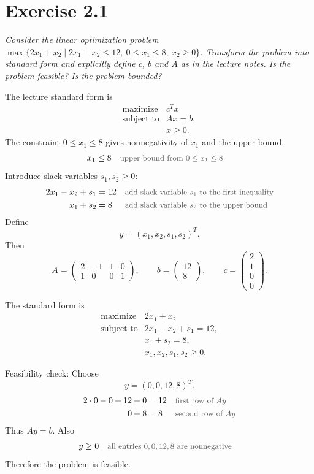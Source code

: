 \documentclass[a4paper,11pt]{article}
\newif\ifexplain
\newcommand{\aufgabe}[1]{\section*{#1}}
\newcommand{\angabe}[1]{\textit{#1}\par\smallskip}
\newcommand{\why}[1]{\text{\small\color{black!65}#1}}
\newcommand{\explain}[1]{\ifexplain\begin{erklbox}#1\end{erklbox}\fi}
\begin{document}
\aufgabe{Exercise 2.1}
\angabe{Consider the linear optimization problem $\max\{2x_1+x_2\mid 2x_1-x_2\le 12,\ 0\le x_1\le 8,\ x_2\ge0\}$. Transform the problem into standard form and explicitly define $c$, $b$ and $A$ as in the lecture notes. Is the problem feasible? Is the problem bounded?}
\explain{Die Vorlesungs-Standardform lautet: maximize $c^Tx$ subject to $Ax=b$ and $x\ge0$. Deshalb werden die Ungleichungen mit Schlupfvariablen in Gleichungen umgeschrieben.}

The lecture standard form is
\[
\begin{array}{ll}
\text{maximize} & c^Tx\\
\text{subject to} & Ax=b,\\
& x\ge0.
\end{array}
\]
The constraint $0\le x_1\le8$ gives nonnegativity of $x_1$ and the upper bound
\begin{align*}
x_1&\le 8 && \why{upper bound from $0\le x_1\le8$}
\end{align*}
Introduce slack variables $s_1,s_2\ge0$:
\begin{align*}
2x_1-x_2+s_1&=12 && \why{add slack variable $s_1$ to the first inequality}\\
x_1+s_2&=8 && \why{add slack variable $s_2$ to the upper bound}
\end{align*}
Define
\[
y=(x_1,x_2,s_1,s_2)^T.
\]
Then
\[
A=\begin{pmatrix}
2&-1&1&0\\
1&0&0&1
\end{pmatrix},\qquad
b=\begin{pmatrix}12\\8\end{pmatrix},\qquad
c=\begin{pmatrix}2\\1\\0\\0\end{pmatrix}.
\]
\explain{Die Nullen in $c$ stehen dort, weil die Schlupfvariablen nur Nebenbedingungen ausgleichen und nicht in der ursprünglichen Zielfunktion vorkommen.}
The standard form is
\[
\boxed{
\begin{array}{ll}
\text{maximize} & 2x_1+x_2\\[1mm]
\text{subject to} & 2x_1-x_2+s_1=12,\\
& x_1+s_2=8,\\
& x_1,x_2,s_1,s_2\ge0.
\end{array}}
\]

Feasibility check:
Choose
\[
y=(0,0,12,8)^T.
\]
\begin{align*}
2\cdot0-0+12+0&=12 && \why{first row of $Ay$}\\
0+8&=8 && \why{second row of $Ay$}
\end{align*}
Thus $Ay=b$.
Also
\begin{align*}
y&\ge0 && \why{all entries $0,0,12,8$ are nonnegative}
\end{align*}
Therefore the problem is feasible.
\end{document}
